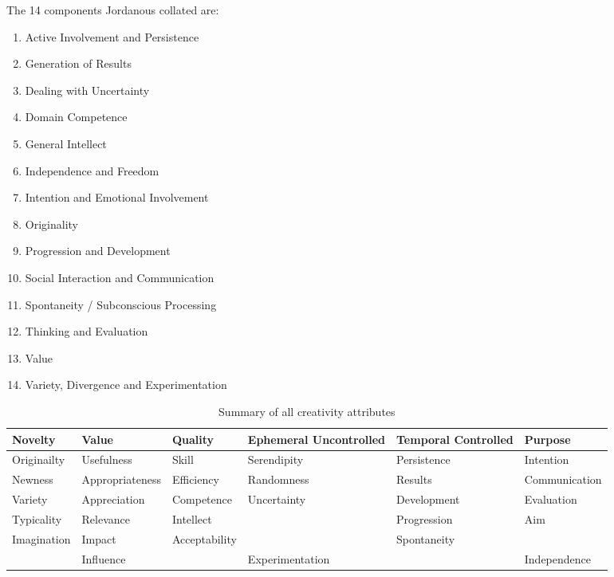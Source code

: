 The 14 components Jordanous collated are: \citep[p.118-120]{Jordanous2012}
\begin{enumerate}
  \item Active Involvement and Persistence
  \item Generation of Results
  \item Dealing with Uncertainty
  \item Domain Competence
  \item General Intellect
  \item Independence and Freedom
  \item Intention and Emotional Involvement
  \item Originality
  \item Progression and Development
  \item Social Interaction and Communication
  \item Spontaneity / Subconscious Processing
  \item Thinking and Evaluation
  \item Value
  \item Variety, Divergence and Experimentation
\end{enumerate}

\begin{table}[htb]
  \begin{tabu}{XXXXXX}
  \toprule
  \textbf{Novelty}
  &
  \textbf{Value}
  &
  \textbf{Quality}
  &
  \textbf{Ephemeral Uncontrolled}
  &
  \textbf{Temporal Controlled}
  &
  \textbf{Purpose}
  \\ \midrule
  Originailty
  &
  Usefulness
  &
  Skill
  &
  Serendipity
  &
  Persistence
  &
  Intention
  \\ \midrule
  Newness
  &
  Appropriateness
  &
  Efficiency
  &
  Randomness
  &
  Results
  &
  Communication
  \\ \midrule
  Variety
  &
  Appreciation
  &
  Competence
  &
  Uncertainty
  &
  Development
  &
  Evaluation
  \\ \midrule
  Typicality
  &
  Relevance
  &
  Intellect
  &
  &
  Progression
  &
  Aim
  \\ \midrule
  Imagination
  &
  Impact
  &
  Acceptability
  &
  &
  Spontaneity
  &
  \\ \midrule
  &
  Influence
  &
  &
  Experimentation
  &
  &
  Independence
  \\
  \bottomrule
  \end{tabu}
\caption[Creativity attributes]{Summary of all creativity attributes}
\label{creatt}
\end{table}

